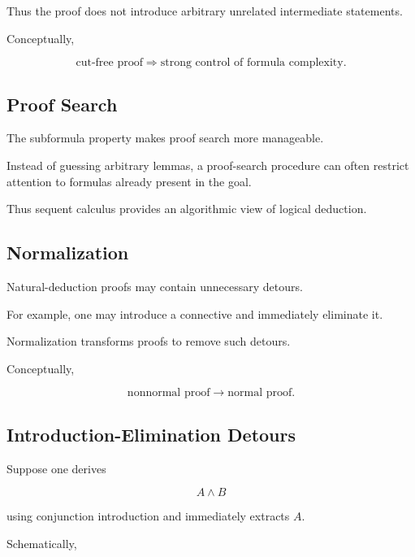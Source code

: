 Thus the proof does not introduce arbitrary unrelated intermediate
statements.

Conceptually,

\[
\boxed{
\text{cut-free proof}
\Longrightarrow
\text{strong control of formula complexity}.
}
\]

\subsection{Proof Search}
\label{subsec:proof-search}

The subformula property makes proof search more manageable.

Instead of guessing arbitrary lemmas, a proof-search procedure can often
restrict attention to formulas already present in the goal.

Thus sequent calculus provides an algorithmic view of logical deduction.

\subsection{Normalization}
\label{subsec:proof-normalization}

Natural-deduction proofs may contain unnecessary detours.

For example, one may introduce a connective and immediately eliminate it.

Normalization transforms proofs to remove such detours.

Conceptually,

\[
\boxed{
\text{nonnormal proof}
\longrightarrow
\text{normal proof}.
}
\]

\subsection{Introduction-Elimination Detours}
\label{subsec:introduction-elimination-detours}

Suppose one derives

\[
A\land B
\]

using conjunction introduction and immediately extracts \(A\).

Schematically,

